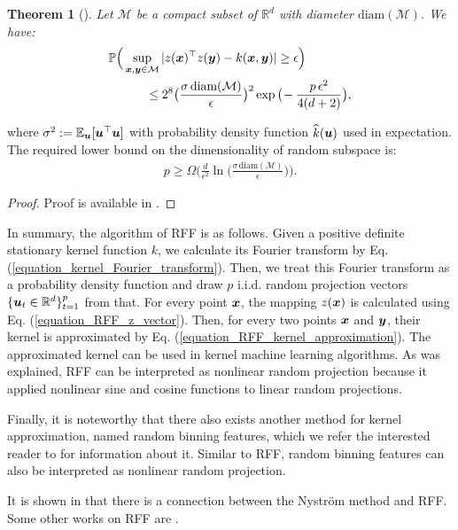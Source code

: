 \documentclass{article}
\newtheorem{theorem}{Theorem}
\def\b{\ensuremath\boldsymbol}
\begin{document}
\begin{theorem}[{\citep[Claim 1]{rahimi2007random}}]
Let $\mathcal{M}$ be a compact subset of $\mathbb{R}^d$ with diameter $\text{diam}(\mathcal{M})$. We have:
\begin{align}
&\mathbb{P}\Big(\sup_{\b{x}, \b{y} \in \mathcal{M}} |z(\b{x})^\top z(\b{y}) - k(\b{x}, \b{y})| \geq \epsilon\Big) \nonumber\\
&~~~~~~~~~\leq 2^8 \big(\frac{\sigma\, \text{diam}(\mathcal{M})}{\epsilon}\big)^2 \exp\big(\!-\frac{p\,\epsilon^2}{4(d+2)}\big),
\end{align}
\end{theorem}
where $\sigma^2 := \mathbb{E}_{\b{u}}[\b{u}^\top \b{u}]$ with probability density function $\widehat{k}(\b{u})$ used in expectation. The required lower bound on the dimensionality of random subspace is:
\begin{align}
p \geq \Omega\Big(\frac{d}{\epsilon^2} \ln\big(\frac{\sigma\, \text{diam}(\mathcal{M})}{\epsilon}\big)\Big).
\end{align}
\begin{proof}
Proof is available in {\citep[Appendix A]{rahimi2007random}}.
\end{proof}

In summary, the algorithm of RFF is as follows. Given a positive definite stationary kernel function $k$, we calculate its Fourier transform by Eq. (\ref{equation_kernel_Fourier_transform}). Then, we treat this Fourier transform as a probability density function and draw $p$ i.i.d. random projection vectors $\{\b{u}_t \in \mathbb{R}^d\}_{t=1}^p$ from that. For every point $\b{x}$, the mapping $z(\b{x})$ is calculated using Eq. (\ref{equation_RFF_z_vector}). Then, for every two points $\b{x}$ and $\b{y}$, their kernel is approximated by Eq. (\ref{equation_RFF_kernel_approximation}). The approximated kernel can be used in kernel machine learning algorithms. 
As was explained, RFF can be interpreted as nonlinear random projection because it applied nonlinear sine and cosine functions to linear random projections. 

Finally, it is noteworthy that there also exists another method for kernel approximation, named random binning features, which we refer the interested reader to \cite{rahimi2007random} for information about it. Similar to RFF, random binning features can also be interpreted as nonlinear random projection. 

It is shown in \cite{yang2012nystrom} that there is a connection between the Nystr{\"o}m method \cite{ghojogh2021reproducing} and RFF. 
Some other works on RFF are \cite{chitta2012efficient,sutherland2015error,sriperumbudur2015optimal,li2019towards}.
\end{document}
